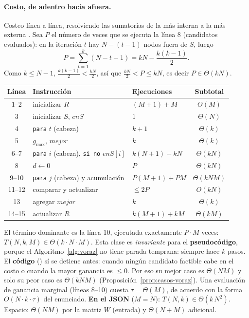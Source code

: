 \paragraph{Costo, de adentro hacia afuera.} Costeo línea a línea, resolviendo las sumatorias de la más interna a la más externa \cite[§2.1]{notas}. Sea $P$ el número de veces que se ejecuta la línea 8 (candidatos evaluados): en la iteración $t$ hay $N-(t-1)$ nodos fuera de $S$, luego
\[
P=\sum_{t=1}^{k}(N-t+1)=kN-\frac{k(k-1)}{2}.
\]
Como $k\le N-1$, $\frac{k(k-1)}{2}<\frac{kN}{2}$, así que $\frac{kN}{2}<P\le kN$, es decir $P\in\Theta(kN)$.
\begin{center}
\small
\begin{tabular}{@{}cllc@{}}
\toprule
Línea & Instrucción & Ejecuciones & Subtotal\\
\midrule
1–2 & inicializar $R$ & $(M+1)+M$ & $\Theta(M)$\\
3 & inicializar $S$, $enS$ & $1$ & $\Theta(N)$\\
4 & \texttt{para} $t$ (cabeza) & $k+1$ & $\Theta(k)$\\
5 & $g_{\max}$, $mejor$ & $k$ & $\Theta(k)$\\
6–7 & \texttt{para} $i$ (cabeza), \texttt{si no} $enS[i]$ & $k(N+1)+kN$ & $\Theta(kN)$\\
8 & $d\gets0$ & $P$ & $\Theta(kN)$\\
9–10 & \texttt{para} $j$ (cabeza) y acumulación & $P(M+1)+PM$ & $\Theta(kNM)$\\
11–12 & comparar y actualizar & $\le 2P$ & $O(kN)$\\
13 & agregar $mejor$ & $k$ & $\Theta(k)$\\
14–15 & actualizar $R$ & $k(M+1)+kM$ & $\Theta(kM)$\\
\bottomrule
\end{tabular}
\end{center}
El término dominante es la línea 10, ejecutada exactamente $P\cdot M$ veces: $T(N,k,M)\in\Theta(k\cdot N\cdot M)$. Esta clase es \emph{invariante} para el \textbf{pseudocódigo}, porque el Algoritmo~\ref{alg:voraz} no tiene parada temprana: siempre hace $k$ pasos. El \textbf{código} () sí se detiene antes: cuando ningún candidato factible cabe en el costo o cuando la mayor ganancia es $\le0$. Por eso su mejor caso es $\Theta(NM)$ y solo su peor caso es $\Theta(kNM)$ (Proposición~\ref{prop:casos-voraz}). Una evaluación de ganancia marginal (líneas 8–10) cuesta $\tau=\Theta(M)$, de acuerdo con la forma $O(N\cdot k\cdot\tau)$ del enunciado. \textbf{En el JSON} ($M=N$): $T(N,k)\in\Theta(k\,N^2)$. Espacio: $\Theta(NM)$ por la matriz $W$ (entrada) y $\Theta(N+M)$ adicional.

